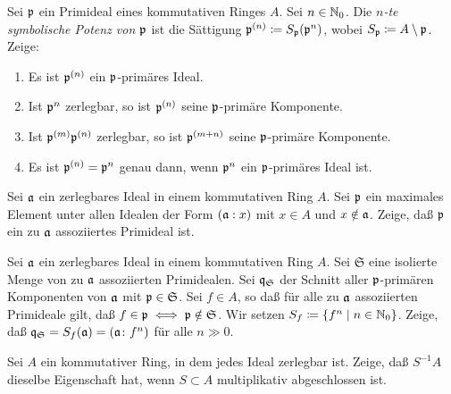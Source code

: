 \begin{exercise}
	\label{exer:symbolic_power}
	Sei \(\mathfrak{p}\) ein Primideal eines kommutativen Ringes \(A\). Sei
	\(n \in \mathbb N_0\). Die \emph{\(n\)-te symbolische Potenz von \(\mathfrak{p}\)}
	ist die Sättigung \(\mathfrak{p}^{(n)} \coloneqq S_{\mathfrak{p}}(\mathfrak{p}^n)\),
	wobei \(S_{\mathfrak{p}} \coloneqq A \setminus \mathfrak{p}\).
	Zeige:
	\begin{enumerate}
	\item
		Es ist \(\mathfrak{p}^{(n)}\) ein \(\mathfrak{p}\)-primäres Ideal.
	\item
		Ist \(\mathfrak{p}^n\) zerlegbar, so ist \(\mathfrak{p}^{(n)}\) seine
		\(\mathfrak{p}\)-primäre Komponente.
	\item
		Ist \(\mathfrak{p}^{(m)} \mathfrak{p}^{(n)}\) zerlegbar, so ist
		\(\mathfrak{p}^{(m + n)}\) seine \(\mathfrak{p}\)-primäre Komponente.
	\item
		Es ist \(\mathfrak{p}^{(n)} = \mathfrak{p}^n\) genau dann, wenn \(\mathfrak{p}^n\)
		ein \(\mathfrak{p}\)-primäres Ideal ist.
	\end{enumerate}
\end{exercise}

\begin{exercise}
	Sei \(\mathfrak{a}\) ein zerlegbares Ideal in einem kommutativen Ring \(A\).
	Sei \(\mathfrak{p}\) ein maximales Element unter allen Idealen der Form
	\((\mathfrak{a} : x)\) mit \(x \in A\) und \(x \notin \mathfrak{a}\). Zeige, daß
	\(\mathfrak{p}\) ein zu \(\mathfrak{a}\) assoziiertes Primideal ist.
\end{exercise}

\begin{exercise}
	\label{exer:component_to_isolated_set}
	Sei \(\mathfrak{a}\) ein zerlegbares Ideal in einem kommutativen Ring \(A\).
	Sei \(\mathfrak S\) eine isolierte Menge von zu \(\mathfrak{a}\)
	assoziierten Primidealen. Sei \(\mathfrak{q}_{\mathfrak S}\) der Schnitt aller
	\(\mathfrak{p}\)-primären Komponenten von \(\mathfrak{a}\) mit \(\mathfrak{p} \in
	\mathfrak S\). Sei \(f \in A\), so daß für alle zu \(\mathfrak{a}\) assoziierten
	Primideale gilt, daß \(f \in \mathfrak{p} \iff \mathfrak{p} \notin \mathfrak S\).
	Wir setzen \(S_f \coloneqq \{f^n \mid n \in \mathbb N_0\}\). Zeige, daß
	\(\mathfrak{q}_{\mathfrak S} = S_f(\mathfrak{a}) = (\mathfrak{a} \colon f^n)\)
	für alle \(n \gg 0\).
\end{exercise}

\begin{exercise}
	Sei \(A\) ein kommutativer Ring, in dem jedes Ideal zerlegbar ist. Zeige,
	daß \(S^{-1} A\) dieselbe Eigenschaft hat, wenn \(S \subset A\)
	multiplikativ abgeschlossen ist.
\end{exercise}

